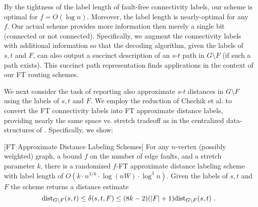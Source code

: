 By the tightness of the label length of fault-free connectivity labels, %
our scheme is optimal for $f=O(\log n)$. Moreover, the label length is nearly-optimal for any $f$. Our actual scheme provides more information then merely a single bit (connected or not connected). Specifically, we augment the connectivity labels with additional information so that the decoding algorithm, given the labels of $s,t$ and $F$, can also output a succinct description of an $s$-$t$ path in $G\setminus F$ (if such a path exists). This succinct path representation finds applications in the context of our FT routing schemes. 
%

We next consider the task of reporting also approximate $s$-$t$ distances in $G\setminus F$ using the labels of $s,t$ and $F$. We employ the reduction of Chechik et al. \cite{chechik2012f} to convert the FT connectivity labels into FT approximate distance labels, providing nearly the same space vs. stretch tradeoff as in the centralized data-structures of \cite{chechik2012f}. Specifically, we show:

\begin{theorem}\label{thm:dist-labels}[FT Approximate Distance Labeling Schemes]
For any $n$-vertex (possibly weighted) graph, a bound $f$ on the number of edge faults, and a stretch parameter $k$, there is a randomized $f$-FT approximate distance labeling scheme with label length of $O(k \cdot n^{1/k}\cdot \log (nW) \cdot \log^3 n)$. Given the labels of $s,t$ and $F$ the scheme returns a distance estimate 
$$\mbox{\rm dist}_{G\setminus F}(s,t)\leq \delta(s,t,F) \leq (8k-2)(|F|+1)\mbox{\rm dist}_{G\setminus F}(s,t)~.$$
\end{theorem}

